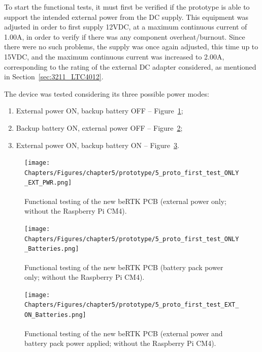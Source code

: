 To start the functional tests, it must first be verified if the prototype is able to support the intended external power from the DC supply. This equipment was adjusted in order to first supply 12VDC, at a maximum continuous current of 1.00A, in order to verify if there was any component overheat/burnout. Since there were no such problems, the supply was once again adjusted, this time up to 15VDC, and the maximum continuous current was increased to 2.00A, corresponding to the rating of the external DC adapter considered, as mentioned in Section~\ref{sec:3211_LTC4012}.

The device was tested considering its three possible power modes:
\begin{enumerate}
	\item External power ON, backup battery OFF -- Figure~\ref{fig:5_proto_first_test_ONLY_EXT_PWR};
	\item Backup battery ON, external power OFF -- Figure~\ref{fig:5_proto_first_test_ONLY_Batteries};
	\item External power ON, backup battery ON -- Figure~\ref{fig:5_proto_first_test_EXT_ON_Batteries}.
\end{enumerate}

\begin{figure}[h]
	\centering
	\texttt{[image: Chapters/Figures/chapter5/prototype/5\_proto\_first\_test\_ONLY\_EXT\_PWR.png]}
	\caption{Functional testing of the new beRTK\textsuperscript{\textregistered} PCB (external power only; without the Raspberry Pi CM4).}
	\label{fig:5_proto_first_test_ONLY_EXT_PWR}
\end{figure}%

\begin{figure}[h]
	\centering
	\texttt{[image: Chapters/Figures/chapter5/prototype/5\_proto\_first\_test\_ONLY\_Batteries.png]}
	\caption{Functional testing of the new beRTK\textsuperscript{\textregistered} PCB (battery pack power only; without the Raspberry Pi CM4).}
	\label{fig:5_proto_first_test_ONLY_Batteries}
\end{figure}%

\begin{figure}[h]
	\centering
	\texttt{[image: Chapters/Figures/chapter5/prototype/5\_proto\_first\_test\_EXT\_ON\_Batteries.png]}
	\caption{Functional testing of the new beRTK\textsuperscript{\textregistered} PCB (external power and battery pack power applied; without the Raspberry Pi CM4).}
	\label{fig:5_proto_first_test_EXT_ON_Batteries}
\end{figure}%


